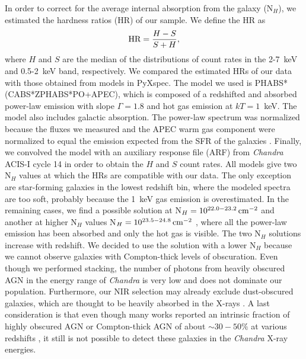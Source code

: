 
In order to correct for the average internal absorption from the galaxy (N$_H$), we estimated the hardness ratios (HR) of our sample. We define the HR as
\begin{equation}  \label{eq:HR}
\centering
\text{HR}=\frac{H-S}{S+H},
\end{equation}
where $H$ and $S$ are the median of the distributions of count rates in the 2-7~keV and 0.5-2~keV band, respectively. 
We compared the estimated HRs of our data with those obtained from models in PyXspec. The model we used is PHABS*(CABS*ZPHABS*PO+APEC), which is composed of a redshifted and absorbed power-law emission with slope $\Gamma=1.8$ and hot gas emission at $kT=1$~keV. The model also includes galactic absorption. The power-law spectrum was normalized because the fluxes we measured and the APEC warm gas component were normalized to equal the emission expected from the SFR of the galaxies \citep[][Eq.~1]{2012MNRAS.426.1870M}. Finally, we convolved the model with an auxiliary response file (ARF) from \textit{Chandra} ACIS-I cycle 14 in order to obtain the $H$ and $S$ count rates. All models give two N$_H$ values at which the HRs are compatible with our data. The only exception are star-forming galaxies in the lowest redshift bin, where the modeled spectra are too soft, probably because the 1~keV gas emission is overestimated. In the remaining cases, we find a possible solution at N$_H = 10^{22.0-23.2}\,\mathrm{cm}^{-2}$ and another at higher N$_H$ values N$_H = 10^{23.5-24.8}\,\mathrm{cm}^{-2}$ , where all the power-law emission has been absorbed and only the hot gas is visible. The two N$_H$ solutions increase with redshift.
We decided to use the solution with a lower N$_H$ because we cannot observe galaxies with Compton-thick levels of obscuration. Even though we performed stacking, the number of photons from heavily obscured AGN in the energy range of \textit{Chandra} is very low and does not dominate our population. Furthermore, our NIR selection may already exclude dust-obscured galaxies, which are thought to be heavily absorbed in the X-rays \citep{2008ApJ...672...94F, 2016A&A...592A.109C, 2019AJ....157..233R}. A last consideration is that even though many works reported an intrinsic fraction of highly obscured AGN or Compton-thick AGN of about $\sim30-50\%$ at various redshifts \citep{2014ApJ...786..104U, 2014MNRAS.445.3557V,2015ApJ...815L..13R,2019ApJ...871..240A}, it still is not possible to detect these galaxies in the \textit{Chandra} X-ray energies.
